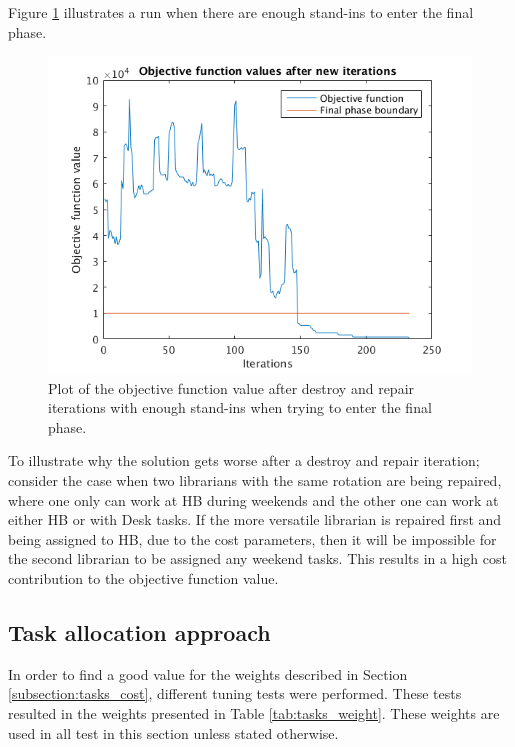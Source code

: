 Figure \ref{fig:feasibleNoRerun} illustrates a run when there are enough stand-ins to enter the final phase.

\begin{figure}[!h]
	\centering
	\includegraphics[scale = 0.8]{Chapters/ImagesClaes/1phase1iterNoReRun.png}
	\caption{Plot of the objective function value after destroy and repair iterations with enough stand-ins when trying to enter the final phase.}
	\label{fig:feasibleNoRerun}
\end{figure}

To illustrate why the solution gets worse after a destroy and repair iteration; consider the case when two librarians with the same rotation are being repaired, where one only can work at HB during weekends and the other one can work at either HB or with Desk tasks. If the more versatile librarian is repaired first and being assigned to HB, due to the cost parameters, then it will be impossible for the second librarian to be assigned any weekend tasks. This results in a high cost contribution to the objective function value.

\subsection{Task allocation approach}\label{sec:task_dist_res}

In order to find a good value for the weights described in Section \ref{subsection:tasks_cost}, different tuning tests were performed. These tests resulted in the weights presented in Table \ref{tab:tasks_weight}. These weights are used in all test in this section unless stated otherwise.

